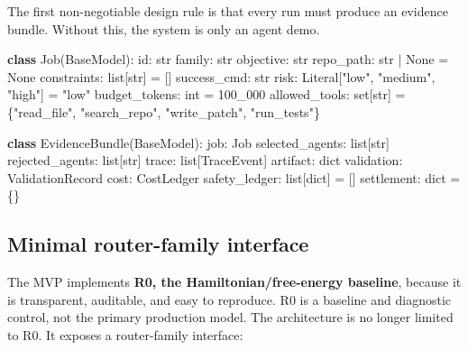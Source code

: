 \documentclass[
  11pt,
]{article}
\newenvironment{Shaded}{}{}
\newcommand{\BuiltInTok}[1]{\textcolor[rgb]{0.00,0.50,0.00}{#1}}
\newcommand{\DecValTok}[1]{\textcolor[rgb]{0.25,0.63,0.44}{#1}}
\newcommand{\KeywordTok}[1]{\textcolor[rgb]{0.00,0.44,0.13}{\textbf{#1}}}
\newcommand{\NormalTok}[1]{#1}
\newcommand{\OperatorTok}[1]{\textcolor[rgb]{0.40,0.40,0.40}{#1}}
\newcommand{\StringTok}[1]{\textcolor[rgb]{0.25,0.44,0.63}{#1}}
\newcommand{\VariableTok}[1]{\textcolor[rgb]{0.10,0.09,0.49}{#1}}
\begin{document}
The first non-negotiable design rule is that every run must produce an
evidence bundle. Without this, the system is only an agent demo.

\begin{Shaded}
\begin{Highlighting}[]
\KeywordTok{class}\NormalTok{ Job(BaseModel):}
    \BuiltInTok{id}\NormalTok{: }\BuiltInTok{str}
\NormalTok{    family: }\BuiltInTok{str}
\NormalTok{    objective: }\BuiltInTok{str}
\NormalTok{    repo\_path: }\BuiltInTok{str} \OperatorTok{|} \VariableTok{None} \OperatorTok{=} \VariableTok{None}
\NormalTok{    constraints: }\BuiltInTok{list}\NormalTok{[}\BuiltInTok{str}\NormalTok{] }\OperatorTok{=}\NormalTok{ []}
\NormalTok{    success\_cmd: }\BuiltInTok{str}
\NormalTok{    risk: Literal[}\StringTok{"low"}\NormalTok{, }\StringTok{"medium"}\NormalTok{, }\StringTok{"high"}\NormalTok{] }\OperatorTok{=} \StringTok{"low"}
\NormalTok{    budget\_tokens: }\BuiltInTok{int} \OperatorTok{=} \DecValTok{100\_000}
\NormalTok{    allowed\_tools: }\BuiltInTok{set}\NormalTok{[}\BuiltInTok{str}\NormalTok{] }\OperatorTok{=}\NormalTok{ \{}\StringTok{"read\_file"}\NormalTok{, }\StringTok{"search\_repo"}\NormalTok{, }\StringTok{"write\_patch"}\NormalTok{, }\StringTok{"run\_tests"}\NormalTok{\}}

\KeywordTok{class}\NormalTok{ EvidenceBundle(BaseModel):}
\NormalTok{    job: Job}
\NormalTok{    selected\_agents: }\BuiltInTok{list}\NormalTok{[}\BuiltInTok{str}\NormalTok{]}
\NormalTok{    rejected\_agents: }\BuiltInTok{list}\NormalTok{[}\BuiltInTok{str}\NormalTok{]}
\NormalTok{    trace: }\BuiltInTok{list}\NormalTok{[TraceEvent]}
\NormalTok{    artifact: }\BuiltInTok{dict}
\NormalTok{    validation: ValidationRecord}
\NormalTok{    cost: CostLedger}
\NormalTok{    safety\_ledger: }\BuiltInTok{list}\NormalTok{[}\BuiltInTok{dict}\NormalTok{] }\OperatorTok{=}\NormalTok{ []}
\NormalTok{    settlement: }\BuiltInTok{dict} \OperatorTok{=}\NormalTok{ \{\}}
\end{Highlighting}
\end{Shaded}

\subsection{Minimal router-family
interface}\label{minimal-router-family-interface}

The MVP implements \textbf{R0, the Hamiltonian/free-energy baseline},
because it is transparent, auditable, and easy to reproduce. R0 is a
baseline and diagnostic control, not the primary production model. The
architecture is no longer limited to R0. It exposes a router-family
interface:
\end{document}
